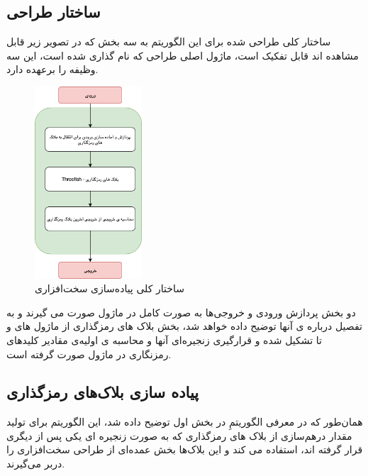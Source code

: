 \subsection{
	ساختار طراحی
}
ساختار کلی طراحی شده برای این الگوریتم به سه بخش که در تصویر زیر قابل مشاهده اند قابل تفکیک است، ماژول اصلی طراحی که 
نام گذاری شده است، این سه وظیفه را بر‌عهده دارد.
\begin{figure}[H]
	\centering
	\includegraphics[width=4cm]{images/skein_functionality.png}	
	\caption{ساختار کلی پیاده‌سازی سخت‌افزاری}
\end{figure}
دو بخش پردازش ورودی و خروجی‌ها به صورت کامل در ماژول 
صورت می گیرند و به تفصیل درباره ی آنها توضیح داده خواهد شد، بخش بلاک های رمزگذاری از ماژول های 
و 
تا 
تشکیل شده و قرارگیری زنجیره‌ای آنها و محاسبه ی اولیه‌ی مقادیر کلید‌های رمزنگاری در ماژول 
صورت گرفته است.

\subsection{
	پیاده سازی بلاک‌های رمزگذاری
}
همان‌طور که در معرفی الگوریتمِ
در بخش اول توضیح داده شد، این الگوریتم برای تولید مقدار درهم‌سازی از بلاک های رمزگذاری که به صورت زنجیره ای یکی پس از دیگری قرار گرفته اند، استفاده می کند و این بلاک‌ها بخش عمده‌ای از طراحی سخت‌افزاری را دربر می‌گیرند. 

